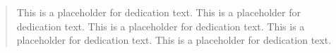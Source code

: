 \frontmatter

\begin{quote}
This is a placeholder for dedication text.
This is a placeholder for dedication text.
This is a placeholder for dedication text.
This is a placeholder for dedication text.
This is a placeholder for dedication text.
\end{quote}
